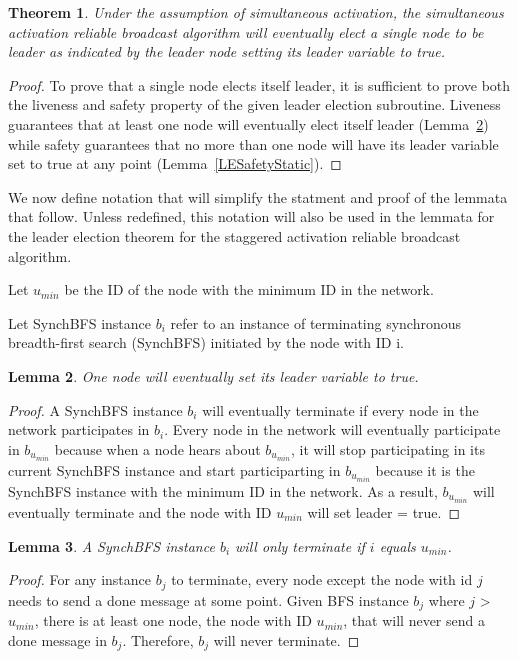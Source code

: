\documentclass[english]{article}
\newtheorem{theorem}{Theorem}[section]
\newtheorem{lemma}[theorem]{Lemma}
\begin{document}
\begin{theorem}
\label{LeaderElectionStatic}
Under the assumption of simultaneous activation, the simultaneous activation reliable broadcast algorithm will eventually elect a single node to be leader as indicated by the leader node setting its leader variable to true.
\end{theorem}
\begin{proof}
To prove that a single node elects itself leader, it is sufficient to prove both the liveness and safety property of the given leader election subroutine. Liveness guarantees that at least one node will eventually elect itself leader (Lemma~\ref{LELivenessStatic}) while safety guarantees that no more than one node will have its leader variable set to true at any point (Lemma~\ref{LESafetyStatic}).
\end{proof}

We now define notation that will simplify the statment and proof of the lemmata that follow. Unless redefined, this notation will also be used in the lemmata for the leader election theorem for the staggered activation reliable broadcast algorithm.

\begin{definition}
Let $u_{min}$ be the ID of the node with the minimum ID in the network. 
\end{definition}

\begin{definition}
Let SynchBFS instance $b_i$ refer to an instance of terminating synchronous breadth-first search (SynchBFS) initiated by the node with ID i.
\end{definition}

\begin{lemma}
\label{LELivenessStatic}
  One node will eventually set its leader variable to true.
\end{lemma}
\begin{proof}
A SynchBFS instance $b_i$ will eventually terminate if every node in the network participates in $b_i$. 
Every node in the network will eventually participate in $b_{u_{min}}$ because when a node hears about $b_{u_{min}}$, it will stop participating in its current SynchBFS instance and start participarting in $b_{u_{min}}$ because it is the SynchBFS instance with the minimum ID in the network. As a result, $b_{u_{min}}$ will eventually terminate and the node with ID $u_{min}$ will set leader = true.
\end{proof}

\begin{lemma}
\label{BFSTermination}
  A SynchBFS instance $b_i$ will only terminate if $i$ equals $u_{min}$.
\end{lemma}
\begin{proof}

For any instance $b_j$ to terminate, every node except the node with id $j$ needs to send a done message at some point. Given BFS instance $b_j$ where $j$ \textgreater $ $ $u_{min}$, there is at least one node, the node with ID $u_{min}$, that will never send a done message in $b_j$. Therefore, $b_j$ will never terminate.
\end{proof}
\end{document}
